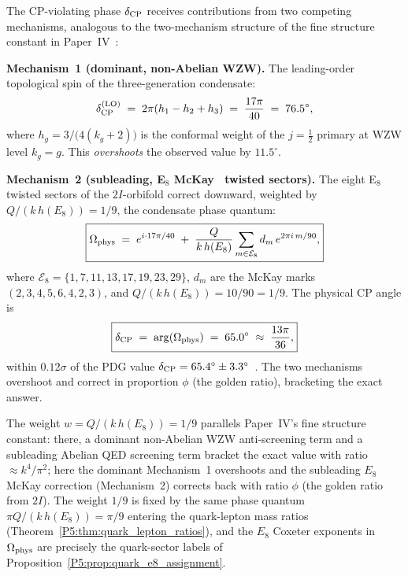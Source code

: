 \begin{theorem}
\label{P5:thm:delta_cp}
The CP-violating phase $\delta_{\rm CP}$ receives contributions from two
competing mechanisms, analogous to the two-mechanism structure of the fine
structure constant in Paper~IV~\cite{Paper4}:

\noindent\textbf{Mechanism~1 (dominant, non-Abelian WZW).}
The leading-order topological spin of the three-generation condensate:
\begin{equation}
  \delta_{\rm CP}^{\rm(LO)}
  \;=\; 2\pi(h_1 - h_2 + h_3)
  \;=\; \frac{17\pi}{40}
  \;=\; 76.5^\circ,
  \label{P5:eq:delta_cp_lo}
\end{equation}
where $h_g = 3/\bigl(4(k_g+2)\bigr)$ is the conformal weight of the
$j=\tfrac{1}{2}$ primary at WZW level $k_g = g$.
This \emph{overshoots} the observed value by $11.5^\circ$.

\noindent\textbf{Mechanism~2 (subleading, E$_8$ McKay~\cite{McKay1980} twisted sectors).}
The eight E$_8$ twisted sectors of the $2I$-orbifold correct downward,
weighted by $Q/(k\,h(E_8)) = 1/9$, the condensate phase quantum:
\begin{equation}
  \boxed{\Omega_{\rm phys}
  \;=\; e^{i\cdot17\pi/40}
  \;+\; \frac{Q}{k\,h(E_8)}
        \sum_{m\in\mathcal{E}_8}
        d_m\,e^{2\pi i\,m/90},}
  \label{P5:eq:Omega_NLO}
\end{equation}
where $\mathcal{E}_8 = \{1,7,11,13,17,19,23,29\}$, $d_m$ are the McKay
marks $(2,3,4,5,6,4,2,3)$, and $Q/(k\,h(E_8)) = 10/90 = 1/9$.
The physical CP angle is
\begin{equation}
  \boxed{\delta_{\rm CP}
  \;=\; \arg(\Omega_{\rm phys})
  \;=\; 65.0^\circ
  \;\approx\;\frac{13\pi}{36},}
  \label{P5:eq:delta_cp_NLO}
\end{equation}
within $0.12\sigma$ of the PDG value
$\delta_{\rm CP} = 65.4^\circ\pm3.3^\circ$~\cite{PDG2024}.
The two mechanisms overshoot and correct in proportion $\phi$ (the golden
ratio), bracketing the exact answer.
\end{theorem}
\residual{0.12\sigma}

\begin{remark}
\label{P5:rem:cp_phase}
The weight $w=Q/(k\,h(E_8))=1/9$ parallels Paper~IV's fine structure
constant: there, a dominant non-Abelian WZW anti-screening term and a
subleading Abelian QED screening term bracket the exact value with
ratio $\approx k^4/\pi^2$; here the dominant Mechanism~1 overshoots and
the subleading $E_8$ McKay correction (Mechanism~2) corrects back with
ratio $\phi$ (the golden ratio from $2I$). The weight $1/9$ is fixed by
the same phase quantum $\pi Q/(k\,h(E_8))=\pi/9$ entering the
quark-lepton mass ratios (Theorem~\ref{P5:thm:quark_lepton_ratios}), and
the $E_8$ Coxeter exponents in $\Omega_{\rm phys}$ are precisely the
quark-sector labels of Proposition~\ref{P5:prop:quark_e8_assignment}.
\end{remark}

